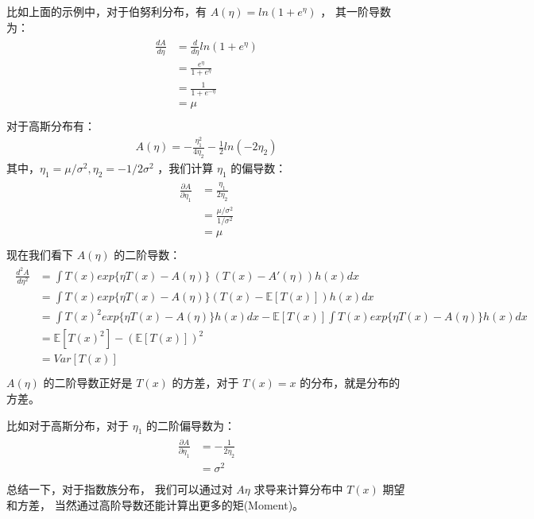 \documentclass[letterpaper,10pt,english]{sphinxmanual}
\begin{document}
比如上面的示例中，对于伯努利分布，有 \(A(\eta)=ln(1+e^\eta)\) ，
其一阶导数为：
\begin{align}\label{equation:指数族/content:指数族/content:18}\!\begin{aligned}
\frac{d A}{d \eta} &= \frac{d }{d \eta} ln(1+e^{\eta})\\
&= \frac{e^{\eta}}{1 + e^{\eta}}\\
&= \frac{1}{1+e^{-\eta}}\\
&= \mu\\
\end{aligned}\end{align}
对于高斯分布有：
\begin{equation}\label{equation:指数族/content:指数族/content:19}
\begin{split}A(\eta) = -\frac{\eta_1^2}{4\eta_2} - \frac{1}{2}ln(-2\eta_2)\end{split}
\end{equation}
其中，\(\eta_1=\mu/\sigma^2,\eta_2=-1/2\sigma^2\) ，我们计算 \(\eta_1\) 的偏导数：
\begin{align}\label{equation:指数族/content:指数族/content:20}\!\begin{aligned}
\frac{\partial A}{\partial \eta_1} &= \frac{\eta_1}{2\eta_2}\\
&= \frac{\mu/\sigma^2}{1/\sigma^2}\\
&= \mu\\
\end{aligned}\end{align}
现在我们看下 \(A(\eta)\) 的二阶导数：
\begin{align}\label{equation:指数族/content:指数族/content:21}\!\begin{aligned}
\frac{d^2 A}{d\eta^2} &=
\int T(x) exp \{ \eta T(x) -A(\eta)\}\ (T(x)- A'(\eta)) h(x) dx\\
&= \int T(x) exp \{\eta T(x) - A(\eta)\}(T(x)-\mathbb{E}[ T(x)] ) h(x) dx\\
&= \int T(x)^2 exp\{ \eta T(x)-A(\eta) \} h(x)dx -
\mathbb{E}[ T(x)] \int T(x) exp\{\eta T(x) -A(\eta)\} h(x) dx\\
&= \mathbb{E}[ T(x)^2] - (\mathbb{E}[ T(x)])^2\\
&= Var [ T(x)]\\
\end{aligned}\end{align}
\(A(\eta)\) 的二阶导数正好是 \(T(x)\) 的方差，对于 \(T(x)=x\) 的分布，就是分布的方差。

比如对于高斯分布，对于 \(\eta_1\) 的二阶偏导数为：
\begin{align}\label{equation:指数族/content:指数族/content:22}\!\begin{aligned}
\frac{\partial A}{\partial \eta_1} &=- \frac{1}{2\eta_2}\\
&= \sigma^2\\
\end{aligned}\end{align}
总结一下，对于指数族分布， 我们可以通过对 \(A{\eta}\) 求导来计算分布中 \(T(x)\) 期望和方差，
当然通过高阶导数还能计算出更多的矩(Moment)。
\end{document}
